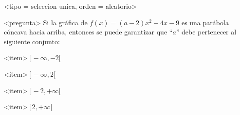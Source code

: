 <tipo = seleccion unica, orden = aleatorio>

<pregunta>
Si la gr\'afica de $f(x) = (a -2)x^2-4x -9$ es una par\'abola c\'oncava hacia arriba, entonces se puede garantizar que ``$a$'' debe pertenecer al siguiente conjunto:


<item>
$]{-}\infty, -2[$

<item>
$]{-}\infty, 2[$

<item>
$]-2, +\infty[$

<item>
$]2, +\infty[$




